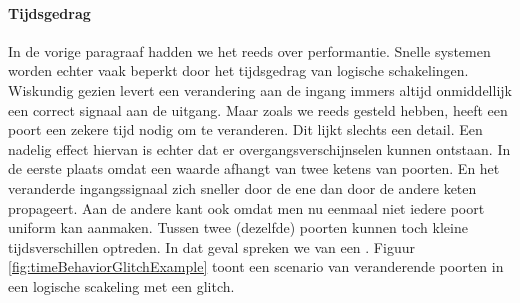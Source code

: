 \paragraph{Tijdsgedrag}In de vorige paragraaf hadden we het reeds over performantie. Snelle systemen worden echter vaak beperkt door het tijdsgedrag van logische schakelingen. Wiskundig gezien levert een verandering aan de ingang immers altijd onmiddellijk een correct signaal aan de uitgang. Maar zoals we reeds gesteld hebben, heeft een poort een zekere tijd nodig om te veranderen. Dit lijkt slechts een detail. Een nadelig effect hiervan is echter dat er overgangsverschijnselen kunnen ontstaan. In de eerste plaats omdat een waarde afhangt van twee ketens van poorten. En het veranderde ingangssignaal zich sneller door de ene dan door de andere keten propageert. Aan de andere kant ook omdat men nu eenmaal niet iedere poort uniform kan aanmaken. Tussen twee (dezelfde) poorten kunnen toch kleine tijdsverschillen optreden. In dat geval spreken we van een . Figuur \ref{fig:timeBehaviorGlitchExample} toont een scenario van veranderende poorten in een logische scakeling met een  glitch.
